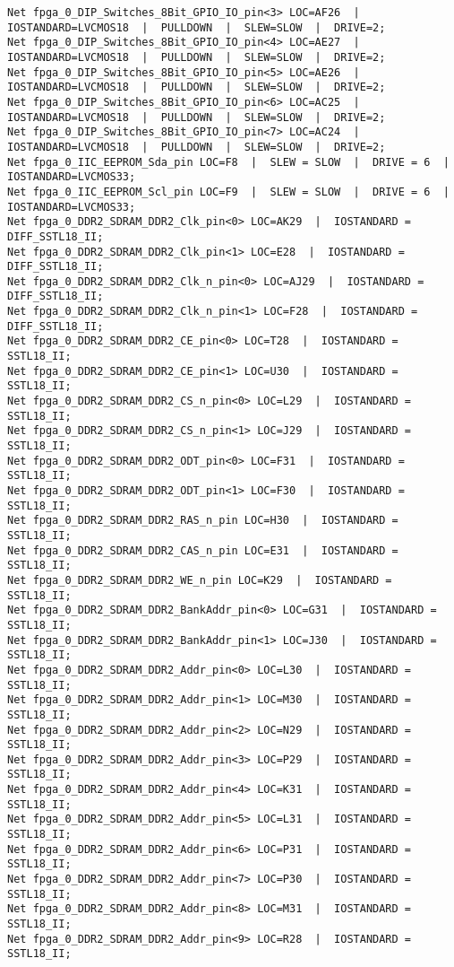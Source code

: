 \begin{verbatim}
Net fpga_0_DIP_Switches_8Bit_GPIO_IO_pin<3> LOC=AF26  |  IOSTANDARD=LVCMOS18  |  PULLDOWN  |  SLEW=SLOW  |  DRIVE=2;
Net fpga_0_DIP_Switches_8Bit_GPIO_IO_pin<4> LOC=AE27  |  IOSTANDARD=LVCMOS18  |  PULLDOWN  |  SLEW=SLOW  |  DRIVE=2;
Net fpga_0_DIP_Switches_8Bit_GPIO_IO_pin<5> LOC=AE26  |  IOSTANDARD=LVCMOS18  |  PULLDOWN  |  SLEW=SLOW  |  DRIVE=2;
Net fpga_0_DIP_Switches_8Bit_GPIO_IO_pin<6> LOC=AC25  |  IOSTANDARD=LVCMOS18  |  PULLDOWN  |  SLEW=SLOW  |  DRIVE=2;
Net fpga_0_DIP_Switches_8Bit_GPIO_IO_pin<7> LOC=AC24  |  IOSTANDARD=LVCMOS18  |  PULLDOWN  |  SLEW=SLOW  |  DRIVE=2;
Net fpga_0_IIC_EEPROM_Sda_pin LOC=F8  |  SLEW = SLOW  |  DRIVE = 6  |  IOSTANDARD=LVCMOS33;
Net fpga_0_IIC_EEPROM_Scl_pin LOC=F9  |  SLEW = SLOW  |  DRIVE = 6  |  IOSTANDARD=LVCMOS33;
Net fpga_0_DDR2_SDRAM_DDR2_Clk_pin<0> LOC=AK29  |  IOSTANDARD = DIFF_SSTL18_II;
Net fpga_0_DDR2_SDRAM_DDR2_Clk_pin<1> LOC=E28  |  IOSTANDARD = DIFF_SSTL18_II;
Net fpga_0_DDR2_SDRAM_DDR2_Clk_n_pin<0> LOC=AJ29  |  IOSTANDARD = DIFF_SSTL18_II;
Net fpga_0_DDR2_SDRAM_DDR2_Clk_n_pin<1> LOC=F28  |  IOSTANDARD = DIFF_SSTL18_II;
Net fpga_0_DDR2_SDRAM_DDR2_CE_pin<0> LOC=T28  |  IOSTANDARD = SSTL18_II;
Net fpga_0_DDR2_SDRAM_DDR2_CE_pin<1> LOC=U30  |  IOSTANDARD = SSTL18_II;
Net fpga_0_DDR2_SDRAM_DDR2_CS_n_pin<0> LOC=L29  |  IOSTANDARD = SSTL18_II;
Net fpga_0_DDR2_SDRAM_DDR2_CS_n_pin<1> LOC=J29  |  IOSTANDARD = SSTL18_II;
Net fpga_0_DDR2_SDRAM_DDR2_ODT_pin<0> LOC=F31  |  IOSTANDARD = SSTL18_II;
Net fpga_0_DDR2_SDRAM_DDR2_ODT_pin<1> LOC=F30  |  IOSTANDARD = SSTL18_II;
Net fpga_0_DDR2_SDRAM_DDR2_RAS_n_pin LOC=H30  |  IOSTANDARD = SSTL18_II;
Net fpga_0_DDR2_SDRAM_DDR2_CAS_n_pin LOC=E31  |  IOSTANDARD = SSTL18_II;
Net fpga_0_DDR2_SDRAM_DDR2_WE_n_pin LOC=K29  |  IOSTANDARD = SSTL18_II;
Net fpga_0_DDR2_SDRAM_DDR2_BankAddr_pin<0> LOC=G31  |  IOSTANDARD = SSTL18_II;
Net fpga_0_DDR2_SDRAM_DDR2_BankAddr_pin<1> LOC=J30  |  IOSTANDARD = SSTL18_II;
Net fpga_0_DDR2_SDRAM_DDR2_Addr_pin<0> LOC=L30  |  IOSTANDARD = SSTL18_II;
Net fpga_0_DDR2_SDRAM_DDR2_Addr_pin<1> LOC=M30  |  IOSTANDARD = SSTL18_II;
Net fpga_0_DDR2_SDRAM_DDR2_Addr_pin<2> LOC=N29  |  IOSTANDARD = SSTL18_II;
Net fpga_0_DDR2_SDRAM_DDR2_Addr_pin<3> LOC=P29  |  IOSTANDARD = SSTL18_II;
Net fpga_0_DDR2_SDRAM_DDR2_Addr_pin<4> LOC=K31  |  IOSTANDARD = SSTL18_II;
Net fpga_0_DDR2_SDRAM_DDR2_Addr_pin<5> LOC=L31  |  IOSTANDARD = SSTL18_II;
Net fpga_0_DDR2_SDRAM_DDR2_Addr_pin<6> LOC=P31  |  IOSTANDARD = SSTL18_II;
Net fpga_0_DDR2_SDRAM_DDR2_Addr_pin<7> LOC=P30  |  IOSTANDARD = SSTL18_II;
Net fpga_0_DDR2_SDRAM_DDR2_Addr_pin<8> LOC=M31  |  IOSTANDARD = SSTL18_II;
Net fpga_0_DDR2_SDRAM_DDR2_Addr_pin<9> LOC=R28  |  IOSTANDARD = SSTL18_II;

\end{verbatim}

